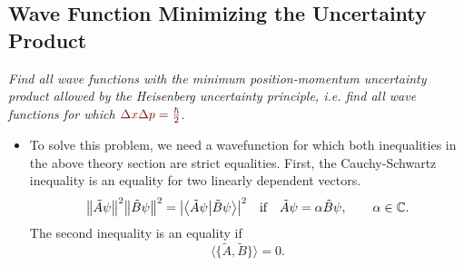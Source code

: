 \documentclass[11pt, a4paper]{article}
\newcommand{\dmath}[1]{\textcolor{Maroon}{#1}}  %
\newcommand{\bbraket}[2]{\big \langle {#1} \big | {#2} \big \rangle}  %
\begin{document}
\subsection{Wave Function Minimizing the Uncertainty Product}
\textit{Find all wave functions with the minimum position-momentum uncertainty product allowed by the Heisenberg uncertainty principle, i.e. find all wave functions for which $ \dmath{\Delta x \Delta p = \frac{\hbar}{2}} $}.
\begin{itemize}
	\item To solve this problem, we need a wavefunction for which both inequalities in the above theory section are strict equalities. First, the Cauchy-Schwartz inequality is an equality for two linearly dependent vectors.
	\begin{equation*}
		\norm{\tilde{A}\psi}^{2}\norm{\tilde{B}\psi}^{2} = \abs{\bbraket{\tilde{A}\psi}{\tilde{B}\psi}}^{2} \quad \text{if} \quad \tilde{A}\psi = \alpha \tilde{B}\psi, \qquad \alpha \in \mathbb{C}.
	\end{equation*}
	The second inequality is an equality if 
	\begin{equation*}
		\big\langle \big\{\tilde{A}, \tilde{B}\big\} \big\rangle = 0.
	\end{equation*}
	

\end{itemize}
\end{document}
